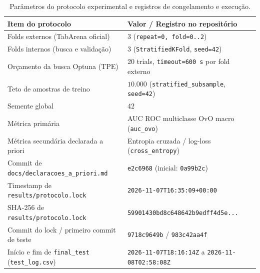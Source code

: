 \documentclass[11pt,a4paper]{article}
\begin{document}
\begin{table}[htbp]
    \centering
    \caption{Parâmetros do protocolo experimental e registros de congelamento e execução.}
    \label{tab:protocolo}
    \small
    \begin{tabular}{@{}ll@{}}
        \toprule
        \textbf{Item do protocolo} & \textbf{Valor / Registro no repositório} \\
        \midrule
        Folds externos (TabArena oficial) & 3 (\texttt{repeat=0, fold=0..2}) \\
        Folds internos (busca e validação) & 3 (\texttt{StratifiedKFold}, \texttt{seed=42}) \\
        Orçamento da busca Optuna (TPE) & 20 trials, \texttt{timeout=600 s} por fold externo \\
        Teto de amostras de treino & $10.000$ (\texttt{stratified\_subsample}, \texttt{seed=42}) \\
        Semente global & $42$ \\
        Métrica primária & AUC ROC multiclasse OvO macro (\texttt{auc\_ovo}) \\
        Métrica secundária declarada a priori & Entropia cruzada / log-loss (\texttt{cross\_entropy}) \\
        Commit de \texttt{docs/declaracoes\_a\_priori.md} & \texttt{e2c6968} (inicial: \texttt{0a99b2c}) \\
        Timestamp de \texttt{results/protocolo.lock} & \texttt{2026-11-07T16:35:09+00:00} \\
        SHA-256 de \texttt{results/protocolo.lock} & \texttt{59901430bd8c648642b9edff4d5e...} \\
        Commit do lock / primeiro commit de teste & \texttt{9718c9649b} / \texttt{983c42aa4f} \\
        Início e fim de \texttt{final\_test} (\texttt{test\_log.csv}) & \texttt{2026-11-07T18:16:14Z} a \texttt{2026-11-08T02:58:08Z} \\
        \bottomrule
    \end{tabular}
\end{table}
\end{document}
